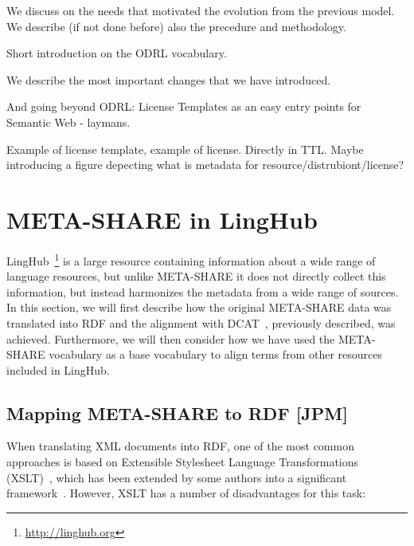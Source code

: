 \documentclass{llncs}
\begin{document}

We discuss on the needs that motivated the evolution from the previous model. We describe (if not done before) also the precedure and methodology.

Short introduction on the ODRL vocabulary. 

We describe the most important changes that we have introduced.

And going beyond ODRL: License Templates as an easy entry points for Semantic Web - laymans.

Example of license template, example of license. Directly in TTL. Maybe introducing a figure depecting what is metadata for resource/distrubiont/license? 

\section{META-SHARE in LingHub}
\label{sec:linghub}

LingHub~\footnote{\url{http://linghub.org}} is a large resource containing information about a wide range of
language resources, but unlike META-SHARE it does not directly collect this
information, but instead harmonizes the metadata from a wide range of sources.
In this section, we will first describe how the original META-SHARE data was
translated into RDF and the alignment with DCAT~\cite{maali2014data}, previously
described, was achieved. Furthermore, we will then consider how we have used the
META-SHARE vocabulary as a base vocabulary to align terms from other resources
included in LingHub.

\subsection{Mapping META-SHARE to RDF [JPM]}
\label{sec:conversion}

When translating XML documents into RDF, one of the most common approaches is
based on Extensible Stylesheet Language Transformations
(XSLT)~\cite{wustner2002converting,van2008xml,borin2014representing}, which has
been extended by some authors into a significant
framework~\cite{lange2009krextor}. However, XSLT has a number of disadvantages
for this task:
\end{document}
